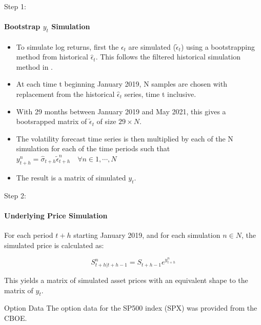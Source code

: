 \documentclass[9pt]{beamer}
\begin{document}
\begin{frame}{Step 1: \citeauthor{faias2017optimal}}
\framesubtitle{Bootstrap $y_{t}$ Simulation}
\begin{itemize}
    \item To simulate log returns, first the $\epsilon_{t}$ are simulated ($\tilde{\epsilon}_{t}$) using a bootstrapping method from historical $\hat{\epsilon}_{t}$. This follows the filtered historical simulation method in \citeauthor{barone2008garch}.
    \item At each time t beginning January 2019, N samples are chosen with replacement from the historical $\hat{\epsilon}_{t}$ series, time t inclusive.
    \item With 29 months between January 2019 and May 2021, this gives a bootsrapped matrix of $\tilde{\epsilon}_{t}$ of size $29 \times N$.
    \item The volatility forecast time series is then multiplied by each of the N simulation for each of the time periods such that $y_{t + h}^{n} = \hat{\sigma}_{t + h} \tilde{\epsilon}_{t + h}^{n} \quad \forall n \in 1, \dotsb, N$
    \item The result is a matrix of simulated $y_{t}$.
\end{itemize}
\end{frame}

\begin{frame}{Step 2: \citeauthor{faias2017optimal}}
\framesubtitle{Underlying Price Simulation}
For each period $t + h$ starting January 2019, and for each simulation $n \in N$, the simulated price is calculated as:

\[S_{t + h|t+h-1}^{n} = S_{t + h - 1} e^{y_{t + h}^{n}}\]

This yields a matrix of simulated asset prices with an equivalent shape to the matrix of $y_{t}$.
\end{frame}

\begin{frame}{Option Data}
The option data for the SP500 index (SPX) was provided from the CBOE.

\begin{center}
	
\end{center}
\end{frame}
\end{document}
